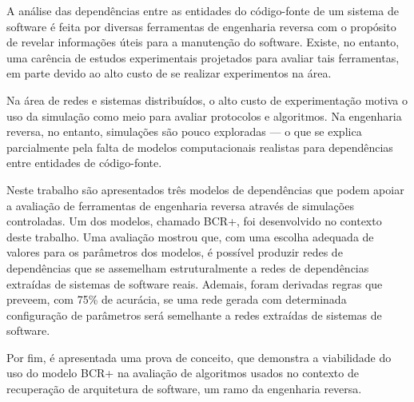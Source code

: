 
A análise das dependências entre as entidades do código-fonte de um sistema de software é feita por diversas ferramentas de engenharia reversa com o propósito de revelar informações úteis para a manutenção do software. Existe, no entanto, uma carência de estudos experimentais projetados para avaliar tais ferramentas, em parte devido ao alto custo de se realizar experimentos na área. 

Na área de redes e sistemas distribuídos, o alto custo de experimentação motiva o uso da simulação como meio para avaliar protocolos e algoritmos. Na engenharia reversa, no entanto, simulações são pouco exploradas --- o que se explica parcialmente pela falta de modelos computacionais realistas para dependências entre entidades de código-fonte.

Neste trabalho são apresentados três modelos de dependências que podem apoiar a avaliação de ferramentas de engenharia reversa através de simulações controladas. Um dos modelos, chamado BCR+, foi desenvolvido no contexto deste trabalho. Uma avaliação mostrou que, com uma escolha adequada de valores para os parâmetros dos modelos, é possível produzir redes de dependências que se assemelham estruturalmente a redes de dependências extraídas de sistemas de software reais. Ademais, foram derivadas regras que preveem, com 75\% de acurácia, se uma rede gerada com determinada configuração de parâmetros será semelhante a redes extraídas de sistemas de software.

Por fim, é apresentada uma prova de conceito, que demonstra a viabilidade do uso do modelo BCR+ na avaliação de algoritmos usados no contexto de recuperação de arquitetura de software, um ramo da engenharia reversa.




